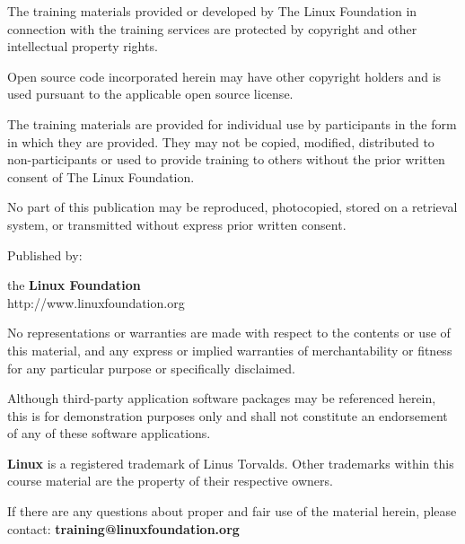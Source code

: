 \lfcopyright

The training materials provided or developed by The Linux
Foundation in connection with the training services are
protected by copyright and other intellectual property
rights.

Open source code incorporated herein may have other
copyright holders and is used pursuant to the applicable
open source license.

The training materials are provided for individual use by
participants in the form in which they are provided. They
may not be copied, modified, distributed to non-participants
or used to provide training to others without the prior
written consent of The Linux Foundation.

No part of this publication may be reproduced, photocopied,
stored on a retrieval system, or transmitted without express
prior written consent.

Published by:

the \textbf{Linux
  Foundation}\\ http://www.linuxfoundation.org

No representations or warranties are made with respect to
the contents or use of this material, and any express or
implied warranties of merchantability or fitness for any
particular purpose or specifically disclaimed.

Although third-party application software packages may be
referenced herein, this is for demonstration purposes only
and shall not constitute an endorsement of any of these
software applications.

\textbf{Linux} is a registered trademark of Linus Torvalds.
Other trademarks within this course material are the
property of their respective owners.

If there are any questions about proper and fair use of the
material herein, please contact: \newline
\textbf{training@linuxfoundation.org}



